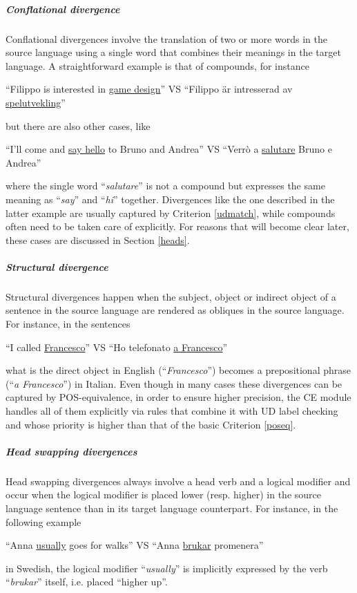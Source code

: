 \subparagraph*{Conflational divergence} \label{confl}
Conflational divergences involve the translation of two or more words in the source language using a single word that combines their meanings in the target language. A straightforward example is that of compounds, for instance
\begin{example} 
 ``Filippo is interested in \underline{game design}'' VS ``Filippo är intresserad av \underline{spelutvekling}''
\end{example}
but there are also other cases, like
\begin{example} 
 ``I'll come and \underline{say hello} to Bruno and Andrea'' VS ``Verrò a \underline{salutare} Bruno e Andrea''
\end{example} 
where the single word ``\textit{salutare}'' is not a compound but expresses the same meaning as ``\textit{say}'' and ``\textit{hi}'' together. \smallskip
Divergences like the one described in the latter example are usually captured by Criterion \ref{udmatch}, while compounds often need to be taken care of explicitly. For reasons that will become clear later, these cases are discussed in Section \ref{heads}.

\subparagraph*{Structural divergence}
Structural divergences happen when the subject, object or indirect object of a sentence in the source language are rendered as obliques in the source language. For instance, in the sentences
\begin{example}
 ``I called \underline{Francesco}'' VS ``Ho telefonato \underline{a Francesco}''
\end{example}
what is the direct object in English (``\textit{Francesco}'') becomes a prepositional phrase (``\textit{a Francesco}'') in Italian. 
Even though in many cases these divergences can be captured by POS-equivalence, in order to ensure higher precision, the CE module handles all of them explicitly via rules that combine it with UD label checking and whose priority is higher than that of the basic Criterion \ref{poseq}.

\subparagraph*{Head swapping divergences}
Head swapping divergences always involve a head verb and a logical modifier and occur when the logical modifier is placed lower (resp. higher) in the source language sentence than in its target language counterpart. For instance, in the following example
\begin{example}
 ``Anna \underline{usually} goes for walks'' VS ``Anna \underline{brukar} promenera''
\end{example} 
in Swedish, the logical modifier ``\textit{usually}'' is implicitly expressed by the verb ``\textit{brukar}'' itself, i.e. placed ``higher up''. \smallskip

